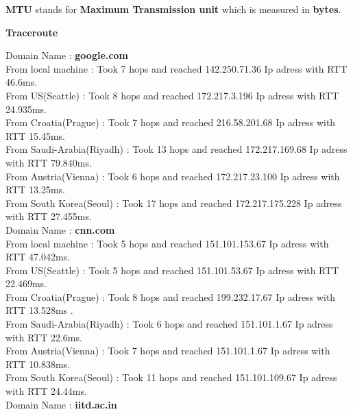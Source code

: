 \documentclass{article}
\theoremstyle{remark}
\newcommand{\tbf}[1]{\textbf{#1}}
\begin{document}
  
\tbf{MTU} stands for \tbf{Maximum Transmission unit} which is measured in \tbf{bytes}.

\tbf{\large{Traceroute}}
\normalsize

Domain Name : \tbf{google.com} \\

From local machine           : Took 7 hops and reached 142.250.71.36 Ip adress with RTT 46.6ms.\\
From US(Seattle)           : Took 8 hops and reached 172.217.3.196 Ip adress with RTT 24.935ms. \\
From Croatia(Prague)         : Took 7 hops and reached 216.58.201.68 Ip adress with RTT 15.45ms. \\
From Saudi-Arabia(Riyadh)  : Took 13 hops and reached 172.217.169.68 Ip adress with RTT 79.840ms. \\
From Austria(Vienna)       : Took 6 hops and reached 172.217.23.100 Ip adress with RTT 13.25ms. \\
From South Korea(Seoul)      : Took 17 hops and reached 172.217.175.228 Ip adress with RTT 27.455ms.\\  


Domain Name : \tbf{cnn.com} \\

From local machine           : Took 5 hops and reached 151.101.153.67 Ip adress with RTT 47.042ms.\\
From US(Seattle)           : Took 5 hops and reached 151.101.53.67 Ip adress with RTT 22.469ms. \\
From Croatia(Prague)         : Took 8 hops and reached 199.232.17.67 Ip adress with RTT 13.528ms . \\
From Saudi-Arabia(Riyadh)  : Took 6 hops and reached 151.101.1.67 Ip adress with RTT 22.6ms. \\
From Austria(Vienna)       : Took 7 hops and reached 151.101.1.67 Ip adress with RTT 10.838ms. \\
From South Korea(Seoul)      : Took 11 hops and reached 151.101.109.67 Ip adress with RTT 24.44ms.\\ 

Domain Name : \tbf{iitd.ac.in} \\
\end{document}

